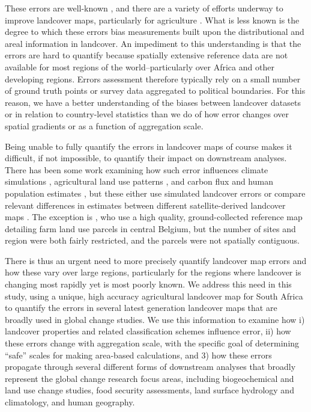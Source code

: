 \documentclass{pnastwo}
\begin{document}
\begin{article}
These errors are well-known \cite{fritz_comparison_2010, fritz_cropland_2011, see_improved_2015, fritz_mapping_2015,verburg_challenges_2011}, and there are a variety of efforts underway to improve landcover maps, particularly for agriculture \cite{fritz_geo-wiki:_2012,estes_diylandcover:_2015}. What is less known is the degree to which these errors bias measurements built upon the distributional and areal information in landcover. An impediment to this understanding is that the errors are hard to quantify because spatially extensive reference data are not available for most regions of the world--particularly over Africa and other developing regions. Errors assessment therefore typically rely on a small number of ground truth points or survey data aggregated to political boundaries. For this reason, we have a better understanding of the biases between landcover datasets or in relation to country-level statistics \cite{fritz_comparison_2010,fritz_cropland_2011,kaptue_tchuente_comparison_2011} than we do of how error changes over spatial gradients or as a function of aggregation scale. 

Being unable to fully quantify the errors in landcover maps of course makes it difficult, if not impossible, to quantify their impact on downstream analyses. There has been some work examining how such error influences climate simulations \cite{ge_impacts_2007}, agricultural land use patterns \cite{schmit_limitations_2006}, and carbon flux \cite{quaife_impact_2008} and human population estimates \cite{linard_assessing_2010}, but these either use simulated landcover errors \cite{ge_impacts_2007} or compare relevant differences in estimates between different satellite-derived landcover maps \cite{linard_assessing_2010, quaife_impact_2008}. The exception is \cite{schmit_limitations_2006}, who use a high quality, ground-collected reference map detailing farm land use parcels in central Belgium, but the number of sites and region were both fairly restricted, and the parcels were not spatially contiguous. 

There is thus an urgent need to more precisely quantify landcover map errors and how these vary over large regions, particularly for the regions where landcover is changing most rapidly yet is most poorly known.  We address this need in this study, using a unique, high accuracy agricultural landcover map for South Africa to quantify the errors in several latest generation landcover maps that are broadly used in global change studies.  We use this information to examine how i) landcover properties and related classification schemes influence error, ii) how these errors change with aggregation scale, with the specific goal of determining ``safe'' scales for making area-based calculations, and 3) how these errors propagate through several different forms of downstream analyses that broadly represent the global change research focus areas, including biogeochemical and land use change studies, food security assessments, land surface hydrology and climatology, and human geography.  


\end{article}
\end{document}
